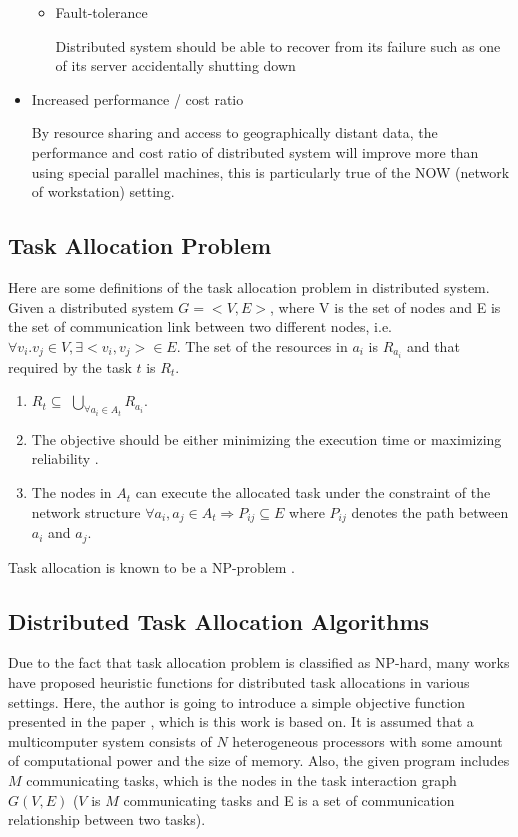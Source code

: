 \begin{itemize}
\begin{itemize}
      	\item{Fault-tolerance}
	
	Distributed system should be able to recover from its failure such as one of its server accidentally shutting down
	
    \end{itemize}
    
    
   \item{Increased performance / cost ratio}
   
     By resource sharing and access to geographically distant data, the performance and cost ratio of distributed system will improve more than using special parallel machines, this is particularly true of the NOW (network of workstation) setting.
     
\end{itemize}

\subsection{Task Allocation Problem}

Here are some definitions of the task allocation problem in distributed system. \cite{definition}
Given a distributed system $G = <V, E>$, where V is the set of nodes and E is the set of communication link between two different nodes, i.e. $\forall v_i. v_j \in V, \exists <v_i, v_j> \in E$.  The set of the resources in $a_i$ is $R_{a_i}$ and that required by the task $t$ is $R_t$.

\begin{enumerate}
	\item{$R_t \subseteq$ $\bigcup_{\forall a_i \in A_t} R_{a_i}$}.
	\item{The objective should be either minimizing the execution time \cite{time} or maximizing reliability \cite{reliability}}.
	\item{The nodes in $A_t$ can execute the allocated task under the constraint of the network structure $\forall a_i, a_j \in A_t \Rightarrow P_{ij} \subseteq E$ where $P_{ij}$ denotes the path between $a_i$ and $a_j$}.
\end{enumerate}

Task allocation is known to be a NP-problem \cite{np}.

\subsection{Distributed Task Allocation Algorithms}

Due to the fact that task allocation problem is classified as NP-hard, many works have proposed heuristic functions for distributed task allocations in various settings.  Here, the author is going to introduce a simple objective function presented in the paper \cite{algorithm}, which is this work is based on. It is assumed that a multicomputer system consists of $N$ heterogeneous processors with some amount of computational power and the size of memory.  Also, the given program includes $M$ communicating tasks, which is the nodes in the task interaction graph $G(V, E)$ ($V$ is $M$ communicating tasks and E is a set of communication relationship between two tasks).

